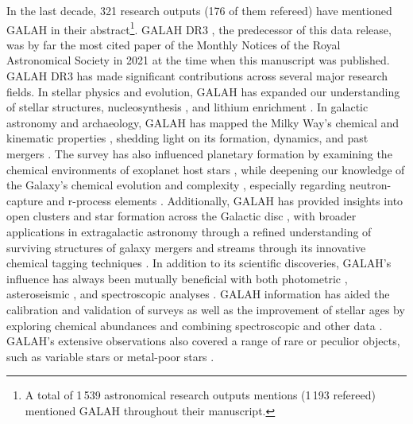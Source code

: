 \documentclass[
  journal=pasa,
  manuscript=research-paper, %
  year=2024,
  volume=37
]{cup-journal}
\begin{document}
In the last decade, 321 research outputs (176 of them refereed) have mentioned GALAH in their abstract\footnote{A total of 1\,539 astronomical research outputs mentions (1\,193 refereed) mentioned GALAH throughout their manuscript.}. GALAH DR3 \citep{Buder2021}, the predecessor of this data release, was by far the most cited paper of the Monthly Notices of the Royal Astronomical Society in 2021 at the time when this manuscript was published. GALAH DR3 has made significant contributions across several major research fields. In stellar physics and evolution, GALAH has expanded our understanding of stellar structures, nucleosynthesis \citep{Sanders2021, Griffith2022}, and lithium enrichment \citep{Martell2021, Simpson2021, Bouma2021, Sayeed2024, Wang2024}. In galactic astronomy and archaeology, GALAH has mapped the Milky Way's chemical and kinematic properties \citep[e.g.][]{BlandHawthorn2019, Sharma2021, Sharma2022}, shedding light on its formation, dynamics, and past mergers \citep{Buder2022}. The survey has also influenced planetary formation by examining the chemical environments of exoplanet host stars \citep{Clark2021, SoaresFurtado2021, Spaargaren2023, Wang2024b}, while deepening our knowledge of the Galaxy's chemical evolution and complexity \citep{Kos2021}, especially regarding neutron-capture and r-process elements \citep{Matsuno2021, Aguado2021, Horta2022, Manea2024}. Additionally, GALAH has provided insights into open clusters and star formation across the Galactic disc \citep[e.g.][]{Spina2021}, with broader applications in extragalactic astronomy through a refined understanding of surviving structures of galaxy mergers and streams \citep{Myeong2022, Buder2022, Manea2022} through its innovative chemical tagging techniques \citep{Buder2022, Buder2024}. In addition to its scientific discoveries, GALAH's influence has always been mutually beneficial with both photometric \citep{Huang2021}, asteroseismic \citep{Zinn2022}, and spectroscopic analyses \citep{Nandakumar2022, Tsantaki2022, Soubiran2022}. GALAH information has aided the calibration and validation of surveys \citep{Casagrande2021, Katz2023, Fremat2023} as well as the improvement of stellar ages by exploring chemical abundances \citep{Hayden2022, Ratcliffe2024} and combining spectroscopic and other data \citep{Hayden2022, Sahlholdt2022, Queiroz2023}. GALAH's extensive observations also covered a range of rare or peculior objects, such as variable stars \citep{Jayasinghe2021} or metal-poor stars \citep{DaCosta2023}.
\end{document}
